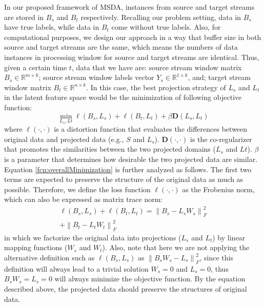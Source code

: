 In our proposed framework of MSDA, instances from source and target streams are stored in $B_{s}$ and $B_{t}$ respectively. 
Recalling our problem setting, data in $B_{s}$ have true labels, while data in $B_t$ come without true labels. 
Also, for computational purposes, we design our approach in a way that buffer size in both source and target streams are the same, which means the numbers of data instances in processing window for source and target streams are identical. 
Thus, given a certain time $t$, data that we have are: source stream window matrix $B_s \in \mathds{R}^{m\times k}$; source stream window labels vector $Y_{s} \in \mathds{R}^{1 \times k}$, and; target stream window matrix $B_t \in \mathds{R}^{n \times k}$. 
In this case, the best projection strategy of $L_{s}$ and $L_{t}$ in the latent feature space would be the minimization of following objective function:
\begin{equation}
\label{fcn:overallMinimization}
    \min_{L_{s}, L{t}}\ell\left ( B_s, L_{s} \right ) + \ell\left ( B_t, L_{t} \right ) + \beta \mathbf{D}\left(L_{s}, L_{t} \right )
\end{equation}
where $\ell\left(\cdot , \cdot \right)$ is a distortion function that evaluates the differences between original data and projected data (e.g., $S$ and $L_{s}$). 
$\mathbf{D}\left(\cdot, \cdot\right)$ is the co-regularizer that promotes the similarities between the two projected domains ($L_{s}$ and $L{t}$). $\beta$ is a parameter that determines how desirable the two projected data are similar. 
Equation \ref{fcn:overallMinimization} is further analyzed as follows. 
The first two terms are expected to preserve the structure of the original data as much as possible. 
Therefore, we define the loss function $\ell\left(\cdot, \cdot\right)$ as the Frobenius norm, which can also be expressed as matrix trace norm:
\begin{equation}
\begin{split}
\label{fcn:norm}
    \ell\left(B_s, L_{s}\right) + \ell\left(B_t, L_{t}\right) = \left \| B_s - L_{s}W_{s}  \right \|_{F}^2 \\
    + \left \| B_t - L_{t}W_{t}\right \|_{F}^2 
\end{split}
\end{equation}
in which we factorize the original data into projections ($L_{s}$ and $L_{t}$) by linear mapping functions ($W_{s}$ and $W_{t}$).
Also, note that here we are not applying the alternative definition such as $\ell\left(B_s,L_{s}\right) $ as $\left \| B_{s}W_{s} - L_{s}  \right \|_{F}^2$, since this definition will always lead to a trivial solution $W_{s} = 0$ and $L_{s} = 0$, thus $B_{s}W_{s} = L_{s} = 0$ will always minimize the objective function. By the equation described above, the projected data should preserve the structures of original data.


